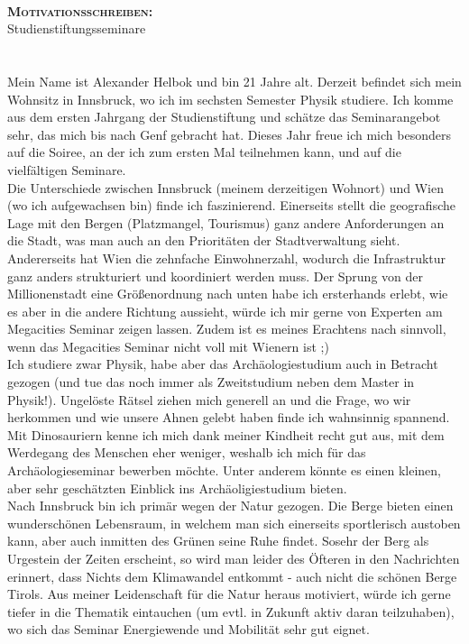 \documentclass{alex_cv}
\begin{document}
	\headerview
	\vspace{2ex}\\
	\begin{minipage}{\linewidth}
		{\large\scshape\bfseries\color{alex} Motivationsschreiben:}\\
		\normalsize Studienstiftungsseminare
	\end{minipage}
	\section{}
	Mein Name ist Alexander Helbok und bin 21 Jahre alt. Derzeit befindet sich mein Wohnsitz in Innsbruck, wo ich im sechsten Semester Physik studiere. Ich komme aus dem ersten Jahrgang der Studienstiftung und schätze das Seminarangebot sehr, das mich bis nach Genf gebracht hat. Dieses Jahr freue ich mich besonders auf die Soiree, an der ich zum ersten Mal teilnehmen kann, und auf die vielfältigen Seminare. \\
	
	Die Unterschiede zwischen Innsbruck (meinem derzeitigen Wohnort) und Wien (wo ich aufgewachsen bin) finde ich faszinierend.	Einerseits stellt die geografische Lage mit den Bergen (Platzmangel, Tourismus) ganz andere Anforderungen an die Stadt, was man auch an den Prioritäten der Stadtverwaltung sieht. Andererseits hat Wien die zehnfache Einwohnerzahl, wodurch die Infrastruktur ganz anders strukturiert und koordiniert werden muss. Der Sprung von der Millionenstadt eine Größenordnung nach unten habe ich ersterhands erlebt, wie es aber in die andere Richtung aussieht, würde ich mir gerne von Experten am Megacities Seminar zeigen lassen. Zudem ist es meines Erachtens nach sinnvoll, wenn das Megacities Seminar nicht voll mit Wienern ist ;) \\
	 
	Ich studiere zwar Physik, habe aber das Archäologiestudium auch in Betracht gezogen (und tue das noch immer als Zweitstudium neben dem Master in Physik!). Ungelöste Rätsel ziehen mich generell an und die Frage, wo wir herkommen und wie unsere Ahnen gelebt haben finde ich wahnsinnig spannend. Mit Dinosauriern kenne ich mich dank meiner Kindheit recht gut aus, mit dem Werdegang des Menschen eher weniger, weshalb ich mich für das Archäologieseminar bewerben möchte. Unter anderem könnte es einen kleinen, aber sehr geschätzten Einblick ins Archäoligiestudium bieten. \\
	
	Nach Innsbruck bin ich primär wegen der Natur gezogen. Die Berge bieten einen wunderschönen Lebensraum, in welchem man sich einerseits sportlerisch austoben kann, aber auch inmitten des Grünen seine Ruhe findet. Sosehr der Berg als Urgestein der Zeiten erscheint, so wird man leider des Öfteren in den Nachrichten erinnert, dass Nichts dem Klimawandel entkommt - auch nicht die schönen Berge Tirols. Aus meiner Leidenschaft für die Natur heraus motiviert, würde ich gerne tiefer in die Thematik eintauchen (um evtl. in Zukunft aktiv daran teilzuhaben), wo sich das Seminar Energiewende und Mobilität sehr gut eignet. 
	
	\createfootnote
\end{document}
